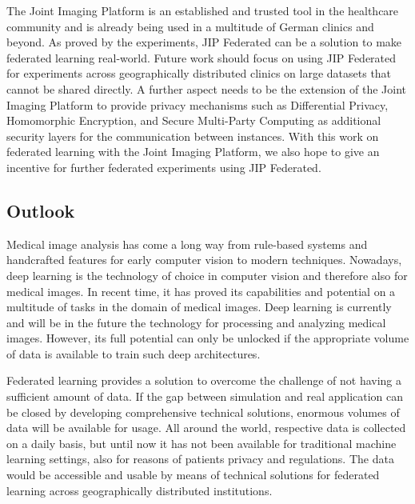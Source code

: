 The Joint Imaging Platform is an established and trusted tool in the healthcare community and is already being used in a multitude of German clinics and beyond.
As proved by the experiments, JIP Federated can be a solution to make federated learning real-world.
Future work should focus on using JIP Federated for experiments across  geographically distributed clinics on large datasets that cannot be shared directly.
A further aspect needs to be the extension of the Joint Imaging Platform to provide privacy mechanisms such as Differential Privacy, Homomorphic Encryption, and Secure Multi-Party Computing as additional security layers for the communication between instances.
With this work on federated learning with the Joint Imaging Platform, we also hope to give an incentive for further federated experiments using JIP Federated.

\subsection{Outlook}
\label{subsec:Outlook}

Medical image analysis has come a long way from rule-based systems and handcrafted features for early computer vision to modern techniques. Nowadays, deep learning is the technology of choice in computer vision and therefore also for medical images. In recent time, it has proved its capabilities and potential on a multitude of tasks in the domain of medical images. Deep learning is currently and will be in the future the technology for processing and analyzing medical images. However, its full potential can only be unlocked if the appropriate volume of data is available to train such deep architectures.

Federated learning provides a solution to overcome the challenge of not having a sufficient amount of data. If the gap between simulation and real application can be closed by developing comprehensive technical solutions, enormous volumes of data will be available for usage. All around the world, respective data is collected on a daily basis, but until now it has not been available for traditional machine learning settings, also for reasons of patients privacy and regulations. The data would be accessible and usable by means of technical solutions for federated learning across geographically distributed institutions.

